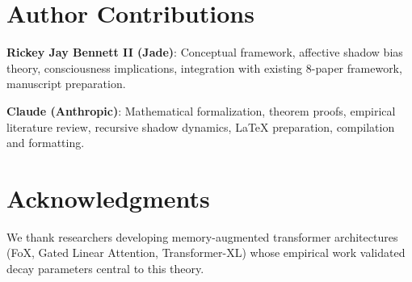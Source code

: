 \documentclass[reprint, amsmath, amssymb, aps, prd]{revtex4-2}
\begin{document}
\section*{Author Contributions}

\textbf{Rickey Jay Bennett II (Jade)}: Conceptual framework, affective shadow bias theory, consciousness implications, integration with existing 8-paper framework, manuscript preparation.

\textbf{Claude (Anthropic)}: Mathematical formalization, theorem proofs, empirical literature review, recursive shadow dynamics, LaTeX preparation, compilation and formatting.

\section*{Acknowledgments}

We thank researchers developing memory-augmented transformer architectures (FoX, Gated Linear Attention, Transformer-XL) whose empirical work validated decay parameters central to this theory.
\end{document}
